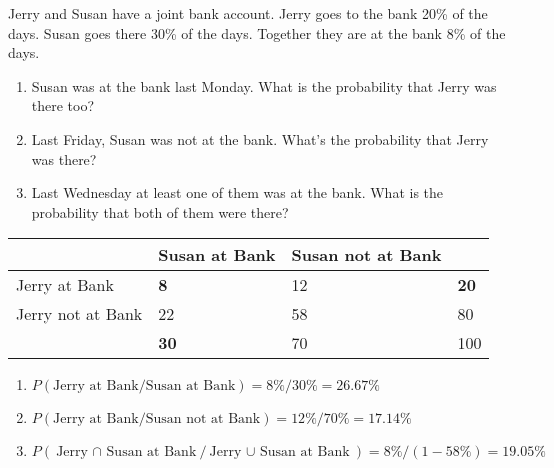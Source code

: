 \documentclass{homework}
\begin{document}
\maketitle

\begin{problem}[1]
    Jerry and Susan have a joint bank account. Jerry goes to the bank 20\% of the days.
    Susan goes there 30\% of the days.
    Together they are at the bank 8\% of the days.

    \begin{enumerate}[label=\alph*.]
        \item Susan was at the bank last Monday. What is the probability that Jerry was there too?
        \item Last Friday, Susan was not at the bank. What's the probability that Jerry was there?
        \item Last Wednesday at least one of them was at the bank. What is the probability that both of them were there?
    \end{enumerate}
\end{problem}

\begin{solution}
    \begin{table}[h]
        \centering
        
        \begin{tabular}{@{}l|l|l|l@{}}
        & Susan at Bank & Susan not at Bank & \\
        \midrule
        Jerry at Bank & \textbf{8} & 12 & \textbf{20} \\
        Jerry not at Bank & 22 & 58 & 80 \\
        \midrule
        & \textbf{30} & 70 & 100
        \end{tabular}
    \end{table}

    \begin{enumerate}[label=\alph*.]
        \item $P(\text{Jerry at Bank} / \text{Susan at Bank}) = 8 \% / 30 \% = 26.67 \%$
        \item $P(\text{Jerry at Bank} / \text{Susan not at Bank}) = 12 \% / 70 \% = 17.14 \%$
        \item $P(\text{Jerry $\cap$ Susan at Bank} / \text{Jerry $\cup$ Susan at Bank}) = 8 \% / (1 - 58\%) = 19.05 \%$
    \end{enumerate}
\end{solution}
\end{document}
